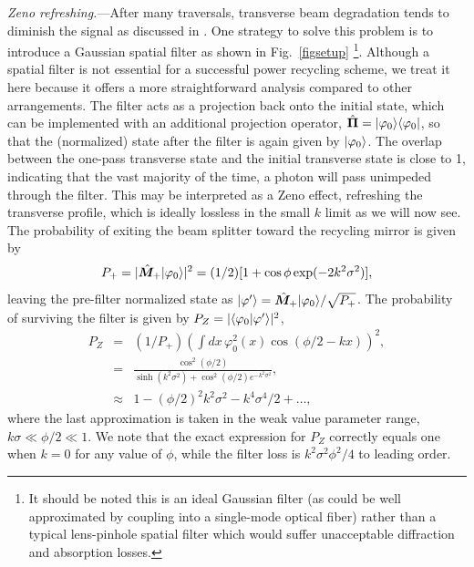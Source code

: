 {\it Zeno refreshing.}---After many traversals, transverse beam degradation tends to diminish the signal as discussed in \cite{Dressel2013}.  One strategy to solve this problem is to introduce a Gaussian spatial filter as shown in Fig.~\ref{figsetup} \footnote{It should be noted this is an ideal Gaussian filter (as could be well approximated by coupling into a single-mode optical fiber) rather than a typical lens-pinhole spatial filter which would suffer unacceptable diffraction and absorption losses.}.  Although a spatial filter is not essential for a successful power recycling scheme, we treat it here because it offers a more straightforward analysis compared to other arrangements.
The filter acts as a projection back onto the initial state, which can be implemented with an additional projection operator,
$\hat{\bm \Pi} = |\varphi_0\rangle \langle \varphi_0|$, so that the (normalized) state after the filter is again given by $\lvert \varphi_0\rangle$.  The overlap between the one-pass transverse state and the initial transverse state is close to 1, indicating that the vast majority of the time, a photon will pass unimpeded through the filter.  This may be interpreted as a Zeno effect, refreshing the transverse profile, which is ideally lossless in the small $k$ limit as we will now see.
The probability of exiting the beam splitter toward the recycling mirror is given by 
\begin{equation}\label{eq:brightprob}
P_+ = |\hat{\bm M}_+ \lvert \varphi_0\rangle|^2 = (1/2) [1+\cos \phi \exp(-2k^2 \sigma^2)],
\end{equation}
leaving the pre-filter normalized state as $\lvert \varphi'\rangle = \hat{\bm M}_+ \lvert \varphi_0\rangle/\sqrt{P_+}$.  The probability of surviving the filter is given by $P_Z = |\langle \varphi_0 \rvert \varphi'\rangle|^2$,
\begin{eqnarray}
P_Z &=& (1/P_+) \left(\int dx\, \varphi_0^2(x) \cos(\phi/2 - kx)\right)^2, \nonumber \\
&=& \frac{\cos^2(\phi/2)}{\sinh(k^2 \sigma^2) + \cos^2(\phi/2) e^{- k^2 \sigma^2}}, \nonumber \\
&\approx& 1 - (\phi/2)^2 k^2 \sigma^2 -k^4 \sigma^4/2 + \ldots,
\end{eqnarray}
where the last approximation is taken in the weak value parameter range, $k \sigma \ll \phi/2 \ll 1$.  We note that the exact expression for $P_Z$ correctly equals one when $k=0$ for any value of $\phi$,
while the filter loss is $k^2\sigma^2 \phi^2/4$ to leading order. %

